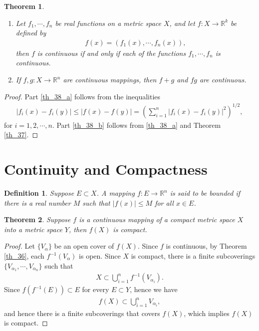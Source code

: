 \documentclass[11pt]{book}
\newtheorem{definition}{Definition}[chapter]
\newtheorem{theorem}{Theorem}[chapter]
\theoremstyle{definition}
\numberwithin{equation}{chapter}
\begin{document}
\begin{theorem}\label{th_38}
~\begin{enumerate}[label=(\alph*)]
    \item Let $f_1, \cdots, f_n$ be real functions on a metric space $X$, and let $f: X \to \mathbb{R}^k$ be defined by
    \begin{align*}
        f(x) = \left(f_1(x), \cdots, f_n(x)\right),
    \end{align*}
    then $f$ is continuous if and only if each of the functions $f_1, \cdots, f_n$ is continuous. \label{th_38_a}
    
    \item If $f,g: X \to \mathbb{R}^n$ are continuous mappings, then $f + g$ and $fg$ are continuous. \label{th_38_b}
\end{enumerate}
\end{theorem}
\begin{proof}
Part \ref{th_38_a} follows from the inequalities
\begin{align*}
    \left|f_i(x) - f_i(y)\right| \leq \left|f(x) - f(y)\right| = \left(\sum^n_{i=1} \left|f_i(x) - f_i(y)\right|^2\right)^{1/2},
\end{align*}
for $i = 1,2,\cdots,n$. Part \ref{th_38_b} follows from \ref{th_38_a} and Theorem \ref{th_37}.
\end{proof}

\medskip




\section{Continuity and Compactness}

\begin{definition}
Suppose $E \subset X$. A mapping $f: E \to \mathbb{R}^n$ is said to be bounded if there is a real number $M$ such that $\left|f(x)\right| \leq M$ for all $x \in E$. 
\end{definition}

\medskip

\begin{theorem}\label{th_39}
Suppose $f$ is a continuous mapping of a compact metric space $X$ into a metric space $Y$, then $f(X)$ is compact.
\end{theorem}
\begin{proof}
Let $\{V_{\alpha}\}$ be an open cover of $f(X)$. Since $f$ is continuous, by Theorem \ref{th_36}, each $f^{-1}(V_{\alpha})$ is open. Since $X$ is compact, there is a finite subcoverings $\{V_{\alpha_1}, \cdots, V_{\alpha_n}\}$ such that
\begin{align*}
    X \subset \bigcup^n_{i=1} f^{-1}(V_{\alpha_i}).
\end{align*}
Since $f\left(f^{-1}(E)\right) \subset E$ for every $E \subset Y$, hence we have
\begin{align*}
    f(X) \subset \bigcup^n_{i=1} V_{\alpha_i},
\end{align*}
and hence there is a finite subcoverings that covers $f(X)$, which implies $f(X)$ is compact.
\end{proof}
\end{document}
